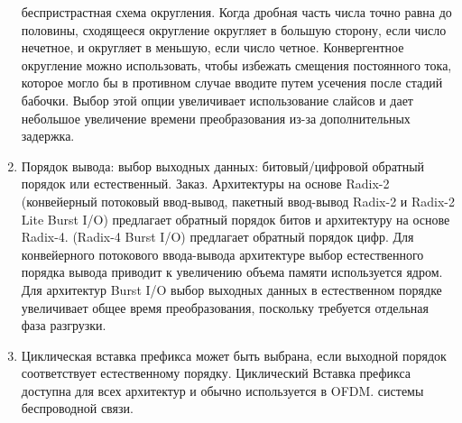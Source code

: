\begin{enumerate}
беспристрастная схема округления. Когда дробная часть числа точно равна
до половины, сходящееся округление округляет в большую сторону, если число нечетное, и округляет в меньшую, если
число четное. Конвергентное округление можно использовать, чтобы избежать смещения постоянного тока, которое могло бы
в противном случае вводите путем усечения после стадий бабочки. Выбор этой опции
увеличивает использование слайсов и дает небольшое увеличение времени преобразования из-за дополнительных
задержка.
\item Порядок вывода: выбор выходных данных: битовый/цифровой обратный порядок или естественный.
Заказ. Архитектуры на основе Radix-2 (конвейерный потоковый ввод-вывод, пакетный ввод-вывод Radix-2 и
Radix-2 Lite Burst I/O) предлагает обратный порядок битов и архитектуру на основе Radix-4.
(Radix-4 Burst I/O) предлагает обратный порядок цифр. Для конвейерного потокового ввода-вывода
архитектуре выбор естественного порядка вывода приводит к увеличению объема памяти
используется ядром. Для архитектур Burst I/O выбор выходных данных в естественном порядке увеличивает
общее время преобразования, поскольку требуется отдельная фаза разгрузки.
\item Циклическая вставка префикса может быть выбрана, если выходной порядок соответствует естественному порядку. Циклический
Вставка префикса доступна для всех архитектур и обычно используется в OFDM.
системы беспроводной связи.
\end{enumerate}

